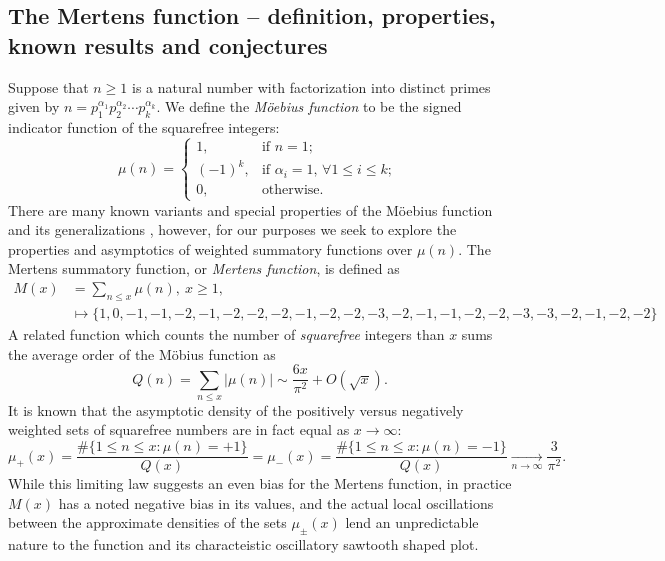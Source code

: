 \documentclass[11pt,reqno,a4letter]{article}
\numberwithin{figure}{section}
\numberwithin{table}{section}
\newcommand{\cf}{\textit{cf.\ }}
\newcommand{\seqnum}[1]{\href{http://oeis.org/#1}{\color{ProcessBlue}{\underline{#1}}}}
\theoremstyle{plain}
\numberwithin{theorem}{section}
\theoremstyle{definition}
\begin{document}
\subsection{The Mertens function -- definition, properties, known results and conjectures} 
\label{subSection_MertensMxClassical_Intro} 

Suppose that $n \geq 1$ is a natural number with factorization into 
distinct primes given by 
$n = p_1^{\alpha_1} p_2^{\alpha_2} \cdots p_k^{\alpha_k}$. 
We define the \emph{M\"oebius function} to be the signed indicator function 
of the squarefree integers: 
\[
\mu(n) = \begin{cases} 
     1, & \text{if $n = 1$; } \\ 
     (-1)^k, & \text{if $\alpha_i = 1$, $\forall 1 \leq i \leq k$; } \\ 
     0, & \text{otherwise.} 
     \end{cases} 
\]
There are many known variants and special properties of the M\"oebius function 
and its generalizations \cite[\cf \S 2]{HANDBOOKNT-2004}, however, for our 
purposes we seek to explore the properties and asymptotics of weighted 
summatory functions over $\mu(n)$. 
The Mertens summatory function, or \emph{Mertens function}, is defined as 
\cite[\seqnum{A002321}]{OEIS} 
\begin{align*} 
M(x) & = \sum_{n \leq x} \mu(n),\ x \geq 1, \\ 
     & \longmapsto \{1, 0, -1, -1, -2, -1, -2, -2, -2, -1, -2, -2, -3, -2, 
     -1, -1, -2, -2, -3, -3, -2, -1, -2, -2\}
\end{align*} 
A related function which counts the 
number of \emph{squarefree} integers than $x$ sums the average order of the M\"obius function as 
\cite[\seqnum{A013928}]{OEIS} 
\[ 
Q(n) = \sum_{n \leq x} |\mu(n)| \sim \frac{6x}{\pi^2} + O\left(\sqrt{x}\right). 
\] 
It is known that the asymptotic density of the positively versus negatively 
weighted sets of squarefree numbers are in fact equal as $x \rightarrow \infty$: 
\[
\mu_{+}(x) = \frac{\#\{1 \leq n \leq x: \mu(n) = +1\}}{Q(x)} = 
     \mu_{-}(x) = \frac{\#\{1 \leq n \leq x: \mu(n) = -1\}}{Q(x)} 
     \xrightarrow[n \rightarrow \infty]{} \frac{3}{\pi^2}. 
\]
While this limiting law suggests an even bias for the Mertens function, 
in practice $M(x)$ has a noted negative bias in its values, and the actual 
local oscillations between the approximate densities of the sets 
$\mu_{\pm}(x)$ lend an unpredictable nature to the function and its 
characteistic oscillatory sawtooth shaped plot. 
\end{document}
